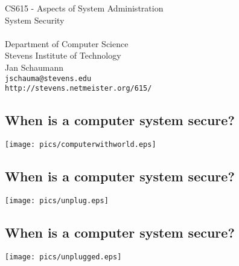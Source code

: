 \documentclass[xga]{xdvislides}
\begin{document}
\setfontphv

\lhead{\slidetitle}                               %
\cfoot{\relax}                               %
\rfoot{\Gray{\today}}
\vspace*{\fill}
\begin{center}
	\Hugesize
		CS615 - Aspects of System Administration\\ [1em]
		System Security\\ [1em]
	\hspace*{5mm}\blueline\\ [1em]
	\Normalsize
		Department of Computer Science\\
		Stevens Institute of Technology\\
		Jan Schaumann\\
		\verb+jschauma@stevens.edu+ \\
		\verb+http://stevens.netmeister.org/615/+
\end{center}
\vspace*{\fill}

\subsection{When is a computer system secure?}
\vspace*{\fill}
\begin{center}
	\texttt{[image: pics/computerwithworld.eps]}
\end{center}
\vspace*{\fill}

\subsection{When is a computer system secure?}
\vspace*{\fill}
\begin{center}
	\texttt{[image: pics/unplug.eps]}
\end{center}
\vspace*{\fill}

\subsection{When is a computer system secure?}
\vspace*{\fill}
\begin{center}
	\texttt{[image: pics/unplugged.eps]}
\end{center}
\vspace*{\fill}
\end{document}
